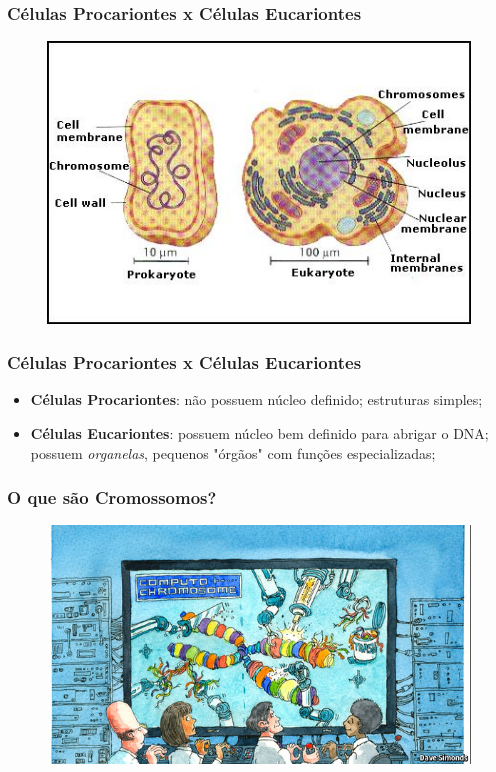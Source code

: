 \documentclass{beamer}
\begin{document}
\begin{frame}
\frametitle{Células Procariontes x Células Eucariontes}
\begin{figure}
\includegraphics[scale=0.55]{prokaryotic-and-eukaryotic-cell-structures.jpeg}
\end{figure}
\end{frame}

\begin{frame}
\frametitle{Células Procariontes x Células Eucariontes}
\begin{itemize}
\item \textbf{Células Procariontes}: não possuem núcleo definido; estruturas simples;
\item \textbf{Células Eucariontes}: possuem núcleo bem definido para abrigar o DNA; possuem \emph{organelas}, pequenos "órgãos" com funções especializadas; 
\end{itemize}
\end{frame}

\begin{frame}
\frametitle{O que são Cromossomos?}
\begin{figure}
\includegraphics[scale=0.5]{students_chromosome.jpg}
\end{figure}
\end{frame}
\end{document}
